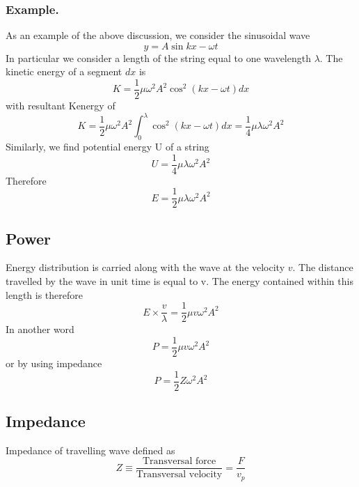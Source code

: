 \documentclass[../../../main.tex]{subfiles}
\begin{document}
\subsubsection{Example.} As an example of the above discussion, we consider the sinusoidal wave
\begin{equation*}
    y=A\sin kx-\omega t
\end{equation*}
In particular we consider a length of the string equal to one wavelength $\lambda$. The kinetic energy of a segment $dx$ is
\begin{equation*}
    K=\frac{1}{2}\mu\omega^2 A^2 \cos^2 (kx-\omega t) dx
\end{equation*}
with resultant Kenergy of
\begin{equation*}
    K=\frac{1}{2}\mu\omega^2 A^2\int_{0}^{\lambda}\cos^2 (kx-\omega t) dx=\frac{1}{4}\mu\lambda\omega^2 A^2
\end{equation*}
Similarly, we find potential energy U of a string 
\begin{equation*}
    U=\frac{1}{4}\mu\lambda\omega^2 A^2
\end{equation*}
Therefore
\begin{equation*}
    E=\frac{1}{2}\mu\lambda\omega^2 A^2
\end{equation*}

\subsection{Power}
Energy distribution is carried along with the wave at the velocity $v$. The distance travelled by the wave in unit time is equal to v. The energy contained within this length is therefore
\begin{equation*}
    E\times \frac{v}{\lambda}=\frac{1}{2}\mu v\omega^2 A^2
\end{equation*}
In another word
\begin{equation*}
    P=\frac{1}{2}\mu v\omega^2 A^2
\end{equation*}
or by using impedance
\begin{equation*}
    P=\frac{1}{2}Z\omega^2 A^2
\end{equation*}

\subsection{Impedance}
Impedance of travelling wave defined as 
\begin{equation*}
    Z\equiv\frac{\text{Transversal force}}{\text{Transversal velocity}} = \frac{F}{v_p}
\end{equation*}
\end{document}
